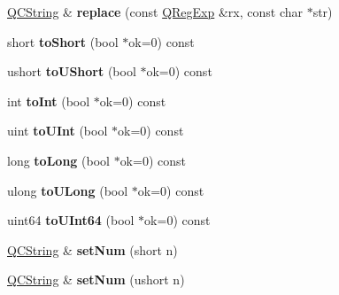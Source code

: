 \begin{DoxyCompactItemize}
\mbox{\label{class_q_c_string_a7091182ef7ed99948596505fb4666e87}} 
\mbox{\hyperlink{class_q_c_string}{Q\+C\+String}} \& {\bfseries replace} (const \mbox{\hyperlink{class_q_reg_exp}{Q\+Reg\+Exp}} \&rx, const char $\ast$str)
\item 
\mbox{\label{class_q_c_string_ae111ca51635d7ef1eb009bfd1439bacf}} 
short {\bfseries to\+Short} (bool $\ast$ok=0) const
\item 
\mbox{\label{class_q_c_string_a649f4a07c797aea9924383284e119413}} 
ushort {\bfseries to\+U\+Short} (bool $\ast$ok=0) const
\item 
\mbox{\label{class_q_c_string_ada27540a0219c6cd64aa7f397d467090}} 
int {\bfseries to\+Int} (bool $\ast$ok=0) const
\item 
\mbox{\label{class_q_c_string_a2bb39962c90acd23d25671ff0b2a6169}} 
uint {\bfseries to\+U\+Int} (bool $\ast$ok=0) const
\item 
\mbox{\label{class_q_c_string_ab4c7c051d9e8be10d15d0f3fcee55420}} 
long {\bfseries to\+Long} (bool $\ast$ok=0) const
\item 
\mbox{\label{class_q_c_string_a044645f142412fc6dc43c1ae28afae0f}} 
ulong {\bfseries to\+U\+Long} (bool $\ast$ok=0) const
\item 
\mbox{\label{class_q_c_string_a3bd11dd76b3e5d20061ffc199f354362}} 
uint64 {\bfseries to\+U\+Int64} (bool $\ast$ok=0) const
\item 
\mbox{\label{class_q_c_string_a87d2bfa3fcbf407c32fab784df368b2d}} 
\mbox{\hyperlink{class_q_c_string}{Q\+C\+String}} \& {\bfseries set\+Num} (short n)
\item 
\mbox{\label{class_q_c_string_a4d574918e9537bcccc0a9fa1d0bc768b}} 
\mbox{\hyperlink{class_q_c_string}{Q\+C\+String}} \& {\bfseries set\+Num} (ushort n)
\item 
\mbox{\label{class_q_c_string_a985317d53986ff869f6200eba01da503}} 

\end{DoxyCompactItemize}
